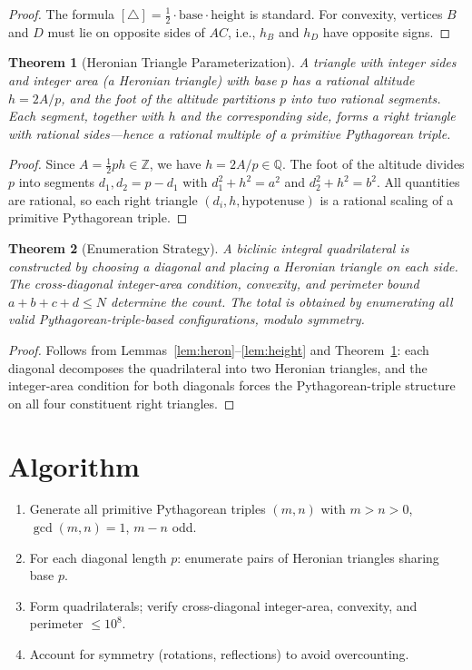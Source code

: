 \documentclass[12pt]{article}
\newtheorem{theorem}{Theorem}
\begin{document}
\begin{proof}
The formula $[\triangle] = \frac{1}{2}\cdot\text{base}\cdot\text{height}$ is standard. For convexity, vertices $B$ and $D$ must lie on opposite sides of $AC$, i.e., $h_B$ and $h_D$ have opposite signs.
\end{proof}

\begin{theorem}[Heronian Triangle Parameterization]\label{thm:heronian}
A triangle with integer sides and integer area (a Heronian triangle) with base $p$ has a rational altitude $h = 2A/p$, and the foot of the altitude partitions $p$ into two rational segments. Each segment, together with $h$ and the corresponding side, forms a right triangle with rational sides---hence a rational multiple of a primitive Pythagorean triple.
\end{theorem}

\begin{proof}
Since $A = \frac{1}{2}ph \in \mathbb{Z}$, we have $h = 2A/p \in \mathbb{Q}$. The foot of the altitude divides $p$ into segments $d_1, d_2 = p - d_1$ with $d_1^2 + h^2 = a^2$ and $d_2^2 + h^2 = b^2$. All quantities are rational, so each right triangle $(d_i, h, \text{hypotenuse})$ is a rational scaling of a primitive Pythagorean triple.
\end{proof}

\begin{theorem}[Enumeration Strategy]\label{thm:enum}
A biclinic integral quadrilateral is constructed by choosing a diagonal and placing a Heronian triangle on each side. The cross-diagonal integer-area condition, convexity, and perimeter bound $a + b + c + d \le N$ determine the count. The total is obtained by enumerating all valid Pythagorean-triple-based configurations, modulo symmetry.
\end{theorem}

\begin{proof}
Follows from Lemmas~\ref{lem:heron}--\ref{lem:height} and Theorem~\ref{thm:heronian}: each diagonal decomposes the quadrilateral into two Heronian triangles, and the integer-area condition for both diagonals forces the Pythagorean-triple structure on all four constituent right triangles.
\end{proof}

\section{Algorithm}

\begin{enumerate}
    \item Generate all primitive Pythagorean triples $(m,n)$ with $m > n > 0$, $\gcd(m,n)=1$, $m-n$ odd.
    \item For each diagonal length $p$: enumerate pairs of Heronian triangles sharing base $p$.
    \item Form quadrilaterals; verify cross-diagonal integer-area, convexity, and perimeter $\le 10^8$.
    \item Account for symmetry (rotations, reflections) to avoid overcounting.
\end{enumerate}
\end{document}
